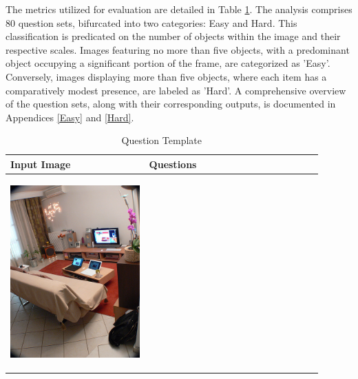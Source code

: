 \documentclass[journal,10pt]{IEEEtran}
\begin{document}
The metrics utilized for evaluation are detailed in Table \ref{tab:question_template}. The analysis comprises 80 question sets, bifurcated into two categories: Easy and Hard. This classification is predicated on the number of objects within the image and their respective scales. Images featuring no more than five objects, with a predominant object occupying a significant portion of the frame, are categorized as 'Easy'. Conversely, images displaying more than five objects, where each item has a comparatively modest presence, are labeled as 'Hard'. A comprehensive overview of the question sets, along with their corresponding outputs, is documented in Appendices \ref{Easy} and \ref{Hard}.
\begin{table}[ht]
    \centering
    \caption{Question Template}
    \label{tab:question_template}
    \begin{tabular}{|p{0.4\linewidth}|p{0.5\linewidth}|}
        \hline
        \textbf{Input Image} &\textbf{Questions}\\
        \hline
        \begin{center} \includegraphics[width=\linewidth]{../image set/hard/000000104739.jpg} \end{center}

\end{tabular}
\end{table}
\end{document}
